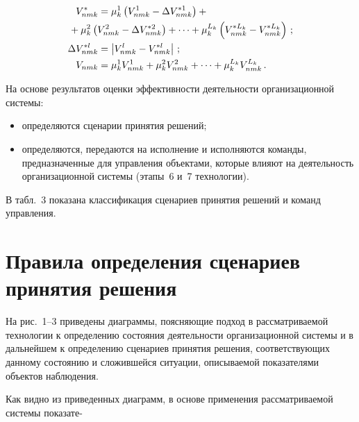 \begin{multicols}{2}

\noindent
\begin{align*}
V^*_{nmk} &= \mu^1_k\left(V^1_{nmk} -\Delta V^{*1}_{nmk}\right)+{}\\
&\hspace*{-30.11438pt}{}+ \mu^2_k\left(V^2_{nmk} -\Delta
V^{*2}_{nmk}\right)+ \cdots+ \mu^{L_k}_k\left (V^{*L_k}_{nmk} -V^{*L_k}_{nmk}\right)\,;
\\
     \Delta V^{*l}_{nmk} &= \left\vert V^l_{nmk} -
V^{*l}_{nmk}\right\vert\,; %
    \\
     V_{nmk} & = \mu^1_kV^1_{nmk} + \mu^2_k V^2_{nmk} +\cdots+
\mu^{L_k}_kV^{L_k}_{nmk}\,.
     \end{align*}

     На основе результатов оценки эффективности деятельности организационной
системы:
     \begin{itemize}
\item  определяются сценарии принятия решений;
\item определяются, передаются на исполнение и исполняются команды,
предназначенные для управления объектами, которые влияют на деятельность
организационной системы (этапы~6 и~7 технологии).
     \end{itemize}

     В табл.~3 показана классификация сценариев принятия решений и команд
управления.

\vspace*{-6pt}

\section{Правила определения сценариев принятия решения}

     На рис.~1--3 приведены диаграммы, по\-яс\-ня\-ющие подход в рассматриваемой
технологии к определению состояния деятельности организа\-ционной системы и в
дальнейшем к определению сценари\-ев принятия решения, соответству\-ющих
данному состоянию и сложившейся ситуации, описываемой показателями объектов
наблюдения.


     Как видно из приведенных диаграмм, в основе применения
рассматриваемой системы показате-\linebreak

\begin{center}  %
\vspace*{2pt}
\mbox{%
\epsfxsize=77.63mm
}
\end{center}
  \vspace*{2pt}


\end{multicols}
